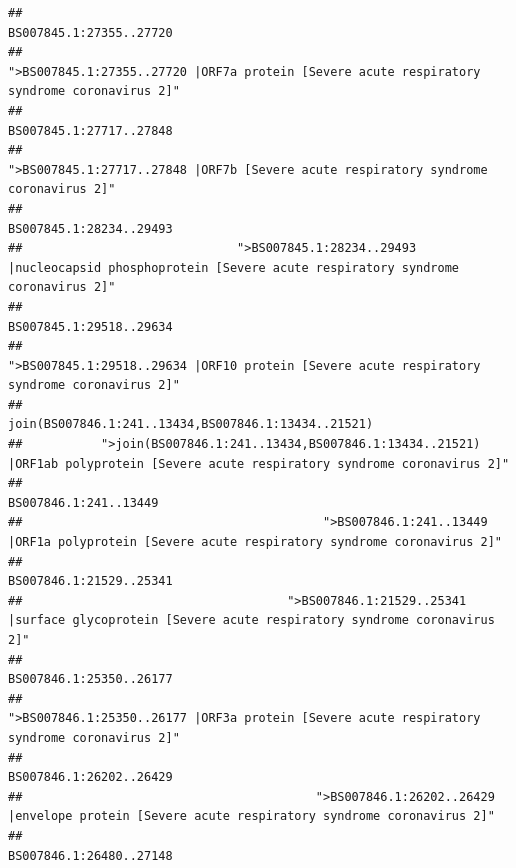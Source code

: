 \documentclass[
]{article}
\begin{document}
\begin{verbatim}
##                                                                                                                BS007845.1:27355..27720 
##                                            ">BS007845.1:27355..27720 |ORF7a protein [Severe acute respiratory syndrome coronavirus 2]" 
##                                                                                                                BS007845.1:27717..27848 
##                                                    ">BS007845.1:27717..27848 |ORF7b [Severe acute respiratory syndrome coronavirus 2]" 
##                                                                                                                BS007845.1:28234..29493 
##                              ">BS007845.1:28234..29493 |nucleocapsid phosphoprotein [Severe acute respiratory syndrome coronavirus 2]" 
##                                                                                                                BS007845.1:29518..29634 
##                                            ">BS007845.1:29518..29634 |ORF10 protein [Severe acute respiratory syndrome coronavirus 2]" 
##                                                                                    join(BS007846.1:241..13434,BS007846.1:13434..21521) 
##           ">join(BS007846.1:241..13434,BS007846.1:13434..21521) |ORF1ab polyprotein [Severe acute respiratory syndrome coronavirus 2]" 
##                                                                                                                  BS007846.1:241..13449 
##                                          ">BS007846.1:241..13449 |ORF1a polyprotein [Severe acute respiratory syndrome coronavirus 2]" 
##                                                                                                                BS007846.1:21529..25341 
##                                     ">BS007846.1:21529..25341 |surface glycoprotein [Severe acute respiratory syndrome coronavirus 2]" 
##                                                                                                                BS007846.1:25350..26177 
##                                            ">BS007846.1:25350..26177 |ORF3a protein [Severe acute respiratory syndrome coronavirus 2]" 
##                                                                                                                BS007846.1:26202..26429 
##                                         ">BS007846.1:26202..26429 |envelope protein [Severe acute respiratory syndrome coronavirus 2]" 
##                                                                                                                BS007846.1:26480..27148 

\end{verbatim}
\end{document}
